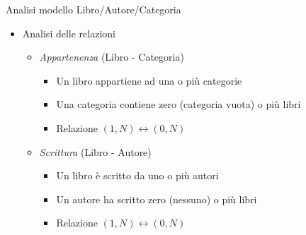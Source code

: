 \begin{frame}{Analisi modello Libro/Autore/Categoria}
    \begin{itemize}
        \item Analisi delle relazioni
            \begin{itemize}
                \item \textit{Appartenenza} (Libro - Categoria)
                    \begin{itemize}
                        \item Un libro appartiene ad una o più categorie
                        \item Una categoria contiene zero (categoria vuota) o più libri
                        \item Relazione $(1,N) \leftrightarrow (0,N)$
                    \end{itemize}
                \item \textit{Scrittura} (Libro - Autore)
                    \begin{itemize}
                        \item Un libro è scritto da uno o più autori
                        \item Un autore ha scritto zero (nessuno) o più libri
                        \item Relazione $(1,N) \leftrightarrow (0,N)$
                    \end{itemize}
            \end{itemize}
    \end{itemize}
\end{frame}

